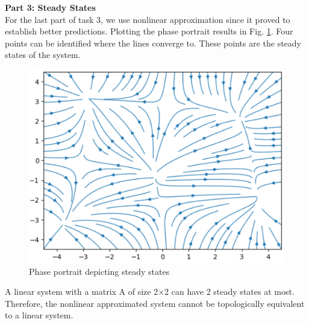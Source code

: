
\textbf{Part 3: Steady States} \\
For the last part of task 3, we use nonlinear approximation since it proved to establish better predictions. Plotting the phase portrait results in Fig. \ref{fig:5-3-3}. Four points can be identified where the lines converge to. These points are the steady states of the system. 

\begin{figure}[H]
    \centering
    \includegraphics[width=0.7\linewidth]{images/5_3_3_phaseportrait-steadystates.png}
    \caption{Phase portrait depicting steady states}
    \label{fig:5-3-3}
\end{figure}

A linear system with a matrix A of size 2×2 can have 2 steady states at most. Therefore, the nonlinear approximated system cannot be topologically equivalent to a linear system. 

